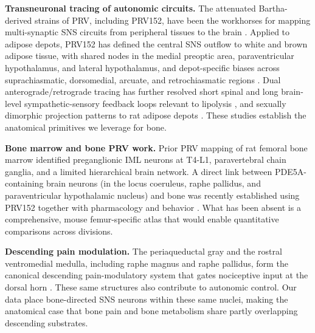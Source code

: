 \textbf{Transneuronal tracing of autonomic circuits.} The attenuated Bartha-derived strains of PRV, including PRV152, have been the workhorses for mapping multi-synaptic SNS circuits from peripheral tissues to the brain \cite{card2001transneuronal,ekstrand2008alpha,card1995influence}. Applied to adipose depots, PRV152 has defined the central SNS outflow to white and brown adipose tissue, with shared nodes in the medial preoptic area, paraventricular hypothalamus, and lateral hypothalamus, and depot-specific biases across suprachiasmatic, dorsomedial, arcuate, and retrochiasmatic regions \cite{bamshad1998central,bamshad1999cns,bartness1998innervation,bartness2014neural,song2008mc4r,shrestha2010central,brito2007differential}. Dual anterograde/retrograde tracing has further resolved short spinal and long brain-level sympathetic-sensory feedback loops relevant to lipolysis \cite{ryu2014short}, and sexually dimorphic projection patterns to rat adipose depots \cite{adler2012neurochemical}. These studies establish the anatomical primitives we leverage for bone.

\textbf{Bone marrow and bone PRV work.} Prior PRV mapping of rat femoral bone marrow identified preganglionic IML neurons at T4-L1, paravertebral chain ganglia, and a limited hierarchical brain network. A direct link between PDE5A-containing brain neurons (in the locus coeruleus, raphe pallidus, and paraventricular hypothalamic nucleus) and bone was recently established using PRV152 together with pharmacology and behavior \cite{kim2020pde5a}. What has been absent is a comprehensive, mouse femur-specific atlas that would enable quantitative comparisons across divisions.

\textbf{Descending pain modulation.} The periaqueductal gray and the rostral ventromedial medulla, including raphe magnus and raphe pallidus, form the canonical descending pain-modulatory system that gates nociceptive input at the dorsal horn \cite{heinricher2009descending,francois2017brainstem,benarroch2012postural}. These same structures also contribute to autonomic control. Our data place bone-directed SNS neurons within these same nuclei, making the anatomical case that bone pain and bone metabolism share partly overlapping descending substrates.
